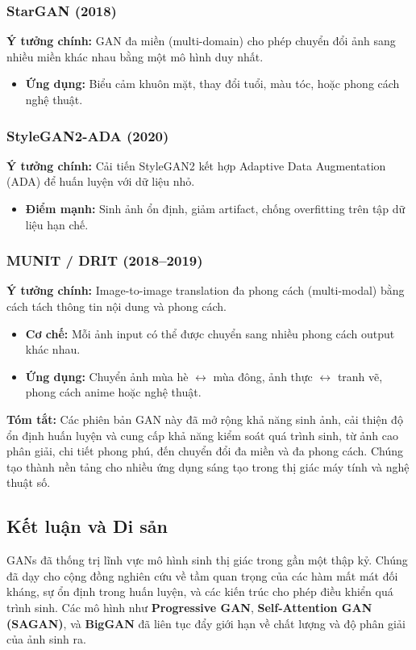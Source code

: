 \subsubsection{StarGAN (2018)}
\textbf{Ý tưởng chính:} GAN đa miền (multi-domain) cho phép chuyển đổi ảnh sang nhiều miền khác nhau bằng một mô hình duy nhất.
\begin{itemize}
	\item \textbf{Ứng dụng:} Biểu cảm khuôn mặt, thay đổi tuổi, màu tóc, hoặc phong cách nghệ thuật.
\end{itemize}

\subsubsection{StyleGAN2-ADA (2020)}
\textbf{Ý tưởng chính:} Cải tiến StyleGAN2 kết hợp Adaptive Data Augmentation (ADA) để huấn luyện với dữ liệu nhỏ.
\begin{itemize}
	\item \textbf{Điểm mạnh:} Sinh ảnh ổn định, giảm artifact, chống overfitting trên tập dữ liệu hạn chế.
\end{itemize}

\subsubsection{MUNIT / DRIT (2018–2019)}
\textbf{Ý tưởng chính:} Image-to-image translation đa phong cách (multi-modal) bằng cách tách thông tin nội dung và phong cách.
\begin{itemize}
	\item \textbf{Cơ chế:} Mỗi ảnh input có thể được chuyển sang nhiều phong cách output khác nhau.
	\item \textbf{Ứng dụng:} Chuyển ảnh mùa hè $\leftrightarrow$ mùa đông, ảnh thực $\leftrightarrow$ tranh vẽ, phong cách anime hoặc nghệ thuật.
\end{itemize}

\textbf{Tóm tắt:} Các phiên bản GAN này đã mở rộng khả năng sinh ảnh, cải thiện độ ổn định huấn luyện và cung cấp khả năng kiểm soát quá trình sinh, từ ảnh cao phân giải, chi tiết phong phú, đến chuyển đổi đa miền và đa phong cách. Chúng tạo thành nền tảng cho nhiều ứng dụng sáng tạo trong thị giác máy tính và nghệ thuật số.

\subsection{Kết luận và Di sản}
\label{subsec:gan_conclusion_legacy}
GANs đã thống trị lĩnh vực mô hình sinh thị giác trong gần một thập kỷ. Chúng đã dạy cho cộng đồng nghiên cứu về tầm quan trọng của các hàm mất mát đối kháng, sự ổn định trong huấn luyện, và các kiến trúc cho phép điều khiển quá trình sinh. Các mô hình như \textbf{Progressive GAN}, \textbf{Self-Attention GAN (SAGAN)}, và \textbf{BigGAN} đã liên tục đẩy giới hạn về chất lượng và độ phân giải của ảnh sinh ra.

